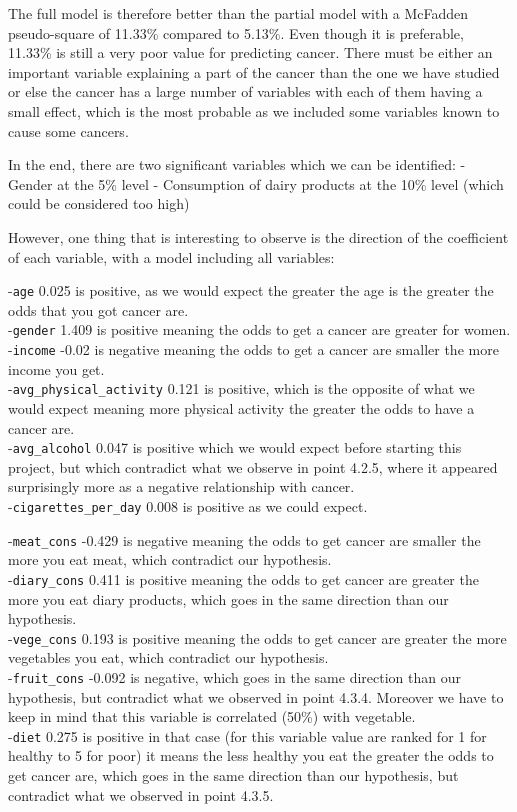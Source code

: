 \documentclass[
]{article}
\begin{document}
The full model is therefore better than the partial model with a
McFadden pseudo-square of 11.33\% compared to 5.13\%. Even though it is
preferable, 11.33\% is still a very poor value for predicting cancer.
There must be either an important variable explaining a part of the
cancer than the one we have studied or else the cancer has a large
number of variables with each of them having a small effect, which is
the most probable as we included some variables known to cause some
cancers.

In the end, there are two significant variables which we can be
identified: - Gender at the 5\% level - Consumption of dairy products at
the 10\% level (which could be considered too high)

However, one thing that is interesting to observe is the direction of
the coefficient of each variable, with a model including all variables:

-\texttt{age} 0.025 is positive, as we would expect the greater the age
is the greater the odds that you got cancer are.\\
-\texttt{gender} 1.409 is positive meaning the odds to get a cancer are
greater for women.\\
-\texttt{income} -0.02 is negative meaning the odds to get a cancer are
smaller the more income you get.\\
-\texttt{avg\_physical\_activity} 0.121 is positive, which is the
opposite of what we would expect meaning more physical activity the
greater the odds to have a cancer are.\\
-\texttt{avg\_alcohol} 0.047 is positive which we would expect before
starting this project, but which contradict what we observe in point
4.2.5, where it appeared surprisingly more as a negative relationship
with cancer.\\
-\texttt{cigarettes\_per\_day} 0.008 is positive as we could expect.

-\texttt{meat\_cons} -0.429 is negative meaning the odds to get cancer
are smaller the more you eat meat, which contradict our hypothesis.\\
-\texttt{diary\_cons} 0.411 is positive meaning the odds to get cancer
are greater the more you eat diary products, which goes in the same
direction than our hypothesis.\\
-\texttt{vege\_cons} 0.193 is positive meaning the odds to get cancer
are greater the more vegetables you eat, which contradict our
hypothesis.\\
-\texttt{fruit\_cons} -0.092 is negative, which goes in the same
direction than our hypothesis, but contradict what we observed in point
4.3.4. Moreover we have to keep in mind that this variable is correlated
(50\%) with vegetable.\\
-\texttt{diet} 0.275 is positive in that case (for this variable value
are ranked for 1 for healthy to 5 for poor) it means the less healthy
you eat the greater the odds to get cancer are, which goes in the same
direction than our hypothesis, but contradict what we observed in point
4.3.5.
\end{document}

